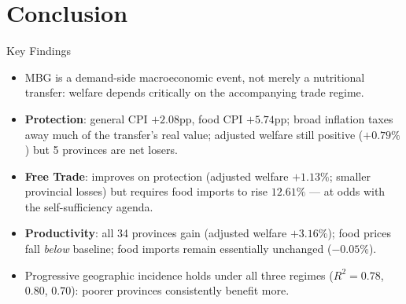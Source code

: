 \documentclass[11pt,aspectratio=169]{beamer}
\begin{document}
\section{Conclusion}

\begin{frame}{Key Findings}
\footnotesize
\begin{itemize}\setlength\itemsep{9pt}
	\item MBG is a demand-side macroeconomic event, not merely a nutritional transfer: welfare depends critically on the accompanying trade regime.
	\item \textbf{Protection}: general CPI $+2.08$pp, food CPI $+5.74$pp; broad inflation taxes away much of the transfer's real value; adjusted welfare still positive ($+0.79\%$) but 5 provinces are net losers.
	\item \textbf{Free Trade}: improves on protection (adjusted welfare $+1.13\%$; smaller provincial losses) but requires food imports to rise $12.61\%$ --- at odds with the self-sufficiency agenda.
	\item \textbf{Productivity}: all 34 provinces gain (adjusted welfare $+3.16\%$); food prices fall \emph{below} baseline; food imports remain essentially unchanged ($-0.05\%$).
	\item Progressive geographic incidence holds under all three regimes ($R^2=0.78$, $0.80$, $0.70$): poorer provinces consistently benefit more.
\end{itemize}
\end{frame}
\end{document}
